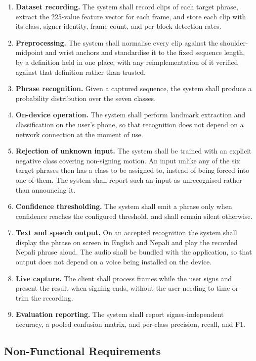 \begin{enumerate}
    \item \textbf{Dataset recording.} The system shall record clips of each target phrase, extract the 225-value feature vector for each frame, and store each clip with its class, signer identity, frame count, and per-block detection rates.
    \item \textbf{Preprocessing.} The system shall normalise every clip against the shoulder-midpoint and wrist anchors and standardise it to the fixed sequence length, by a definition held in one place, with any reimplementation of it verified against that definition rather than trusted.
    \item \textbf{Phrase recognition.} Given a captured sequence, the system shall produce a probability distribution over the seven classes.
    \item \textbf{On-device operation.} The system shall perform landmark extraction and classification on the user's phone, so that recognition does not depend on a network connection at the moment of use.
    \item \textbf{Rejection of unknown input.} The system shall be trained with an explicit negative class covering non-signing motion. An input unlike any of the six target phrases then has a class to be assigned to, instead of being forced into one of them. The system shall report such an input as unrecognised rather than announcing it.
    \item \textbf{Confidence thresholding.} The system shall emit a phrase only when confidence reaches the configured threshold, and shall remain silent otherwise.
    \item \textbf{Text and speech output.} On an accepted recognition the system shall display the phrase on screen in English and Nepali and play the recorded Nepali phrase aloud. The audio shall be bundled with the application, so that output does not depend on a voice being installed on the device.
    \item \textbf{Live capture.} The client shall process frames while the user signs and present the result when signing ends, without the user needing to time or trim the recording.
    \item \textbf{Evaluation reporting.} The system shall report signer-independent accuracy, a pooled confusion matrix, and per-class precision, recall, and F1.
\end{enumerate}

\subsection{Non-Functional Requirements}

